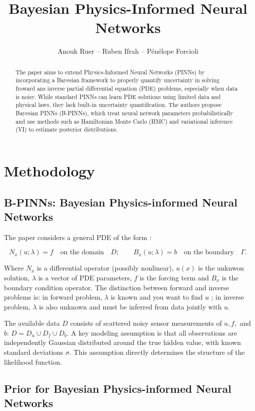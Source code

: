 \documentclass{article}
\title{Bayesian Physics-Informed Neural Networks}
\author{%
  Anouk Ruer -- Ruben Ifrah -- Pénélope Forcioli \\
}
\begin{document}
\maketitle

\begin{abstract}
The paper aims to extend Physics-Informed Neural Networks (PINNs) by incorporating a Bayesian framework to properly quantify uncertainty in solving froward ans inverse partial differential equation (PDE) problems, especially when data is noisy. 
While standard PINNs can learn PDE solutions using limited data and physical laws, they lack built-in uncertainty quantification. The authors propose Bayesian PINNs (B-PINNs), which treat neural network parameters probabilistically and use methods such as Hamiltonian Monte Carlo (HMC) and variational inference (VI) to estimate posterior distributions.
\end{abstract}


\section{Methodology}

\subsection{B-PINNs: Bayesian Physics-informed Neural Networks}
The paper considers a general PDE of the form : 

\[ N_x(u; \lambda) = f \quad \text{on the domain} \quad D ; \qquad
B_x(u; \lambda) = b \quad  \text{on the boundary} \quad \Gamma.
\]

Where $N_x$ is a differential operator (possibly nonlinear), $u(x)$ is the unknwon solution, $\lambda$ is a vector of PDE parameters, $f$ is the forcing term and $B_x$ is the boundary condition operator. The distinction between forward and inverse problems is: in forward problem, $\lambda$ is known and you want to find $u$ ; in inverse problem, $\lambda$ is also unknown and must be inferred from data jointly with $u$.

The available data $D$ consists of scattered noisy sensor measurements of $u, f,$ and $b$:
$D = D_u \cup D_f \cup D_b$.
A key modeling assumption is that all observations are independently Gaussian distributed around the true hidden value, with known standard deviations $\sigma$. This assumption directly determines the structure of the likelihood function.

\subsection{Prior for Bayesian Physics-informed Neural Networks}
\end{document}
